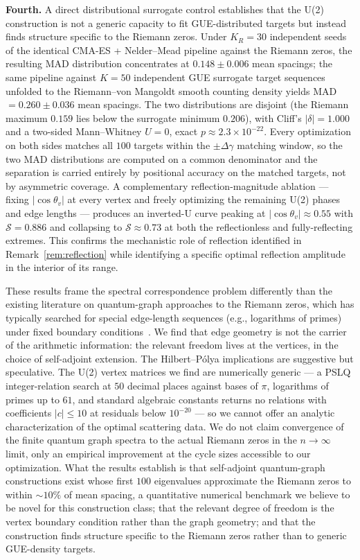 \documentclass[cntp]{ipart}
\theoremstyle{plain}
\theoremstyle{remark}
\begin{document}
\smallskip\noindent\textbf{Fourth.} A direct distributional surrogate control establishes that the U(2) construction is not a generic capacity to fit GUE-distributed targets but instead finds structure specific to the Riemann zeros. Under $K_R = 30$ independent seeds of the identical CMA-ES + Nelder--Mead pipeline against the Riemann zeros, the resulting MAD distribution concentrates at $0.148 \pm 0.006$ mean spacings; the same pipeline against $K = 50$ independent GUE surrogate target sequences unfolded to the Riemann--von Mangoldt smooth counting density yields MAD $= 0.260 \pm 0.036$ mean spacings. The two distributions are disjoint (the Riemann maximum $0.159$ lies below the surrogate minimum $0.206$), with Cliff's $|\delta| = 1.000$ and a two-sided Mann--Whitney $U = 0$, exact $p \approx 2.3 \times 10^{-22}$. Every optimization on both sides matches all $100$ targets within the $\pm \Delta\gamma$ matching window, so the two MAD distributions are computed on a common denominator and the separation is carried entirely by positional accuracy on the matched targets, not by asymmetric coverage. A complementary reflection-magnitude ablation --- fixing $|\cos\theta_v|$ at every vertex and freely optimizing the remaining U(2) phases and edge lengths --- produces an inverted-U curve peaking at $|\cos\theta_v| \approx 0.55$ with $\mathcal{S} = 0.886$ and collapsing to $\mathcal{S} \approx 0.73$ at both the reflectionless and fully-reflecting extremes. This confirms the mechanistic role of reflection identified in Remark~\ref{rem:reflection} while identifying a specific optimal reflection amplitude in the interior of its range.

These results frame the spectral correspondence problem differently than the existing literature on quantum-graph approaches to the Riemann zeros, which has typically searched for special edge-length sequences (e.g., logarithms of primes) under fixed boundary conditions~\cite{r5,r8}. We find that edge geometry is not the carrier of the arithmetic information: the relevant freedom lives at the vertices, in the choice of self-adjoint extension. The Hilbert--P\'olya implications are suggestive but speculative. The U(2) vertex matrices we find are numerically generic --- a PSLQ integer-relation search at $50$ decimal places against bases of $\pi$, logarithms of primes up to $61$, and standard algebraic constants returns no relations with coefficients $|c| \leq 10$ at residuals below $10^{-20}$ --- so we cannot offer an analytic characterization of the optimal scattering data. We do not claim convergence of the finite quantum graph spectra to the actual Riemann zeros in the $n \to \infty$ limit, only an empirical improvement at the cycle sizes accessible to our optimization. What the results establish is that self-adjoint quantum-graph constructions exist whose first $100$ eigenvalues approximate the Riemann zeros to within $\sim 10\%$ of mean spacing, a quantitative numerical benchmark we believe to be novel for this construction class; that the relevant degree of freedom is the vertex boundary condition rather than the graph geometry; and that the construction finds structure specific to the Riemann zeros rather than to generic GUE-density targets.
\end{document}
